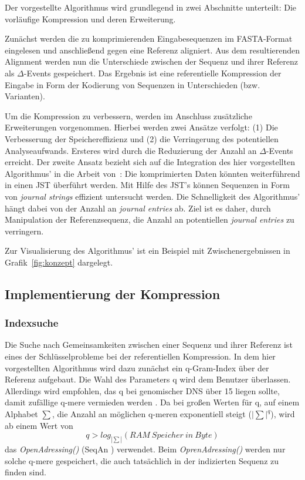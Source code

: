 \documentclass[12pt]{article}
\begin{document}
Der vorgestellte Algorithmus wird grundlegend in zwei Abschnitte unterteilt: Die vorläufige Kompression und deren Erweiterung. 

Zunächst werden die zu komprimierenden Eingabesequenzen im FASTA-Format eingelesen und anschließend gegen eine Referenz aligniert. Aus dem resultierenden Alignment werden nun die Unterschiede zwischen der Sequenz und ihrer Referenz als $\Delta$-Events gespeichert. Das Ergebnis ist eine referentielle Kompression der Eingabe in Form der Kodierung von Sequenzen in Unterschieden (bzw. Varianten).

Um die Kompression zu verbessern, werden im Anschluss zusätzliche Erweiterungen vorgenommen. Hierbei werden zwei Ansätze verfolgt: (1) Die Verbesserung der Speichereffizienz und (2) die Verringerung des potentiellen Analyseaufwands.
Ersteres wird durch die Reduzierung der Anzahl an $\Delta$-Events erreicht. Der zweite Ansatz bezieht sich auf die Integration des hier vorgestellten Algorithmus' in die Arbeit von~\cite{Rahn15072014}: Die komprimierten Daten könnten weiterführend in einen JST überführt werden. Mit Hilfe des JST's können Sequenzen in Form von \textit{journal strings} effizient untersucht werden. Die Schnelligkeit des Algorithmus' hängt dabei von der Anzahl an \textit{journal entries} ab. Ziel ist es daher, durch Manipulation der Referenzsequenz, die Anzahl an potentiellen \textit{journal entries} zu verringern.

Zur Visualisierung des Algorithmus' ist ein Beispiel mit Zwischenergebnissen in Grafik~\ref{fig:konzept} dargelegt.

\subsection{Implementierung der Kompression}
\label{sec:varcall}

\subsubsection{Indexsuche}
Die Suche nach Gemeinsamkeiten zwischen einer Sequenz und ihrer Referenz ist eines der Schlüsselprobleme bei der referentiellen Kompression. In dem hier vorgestellten Algorithmus wird dazu zunächst ein q-Gram-Index über der Referenz aufgebaut. Die Wahl des Parameters q wird dem Benutzer überlassen. Allerdings wird empfohlen, das q bei genomischer DNS über 15 liegen sollte, damit zufällige q-mere vermieden werden \cite{wandelt14trends}. Da bei großen Werten für q, auf einem Alphabet $\sum$, die Anzahl an möglichen q-meren exponentiell steigt ($|\sum|^{q}$), wird ab einem Wert von 
\begin{equation}
q>log_{|\sum|}(RAM~Speicher~in~Byte)
\end{equation}
das \textit{OpenAdressing()} (SeqAn \cite{doering08seqan}) verwendet. Beim \textit{OprenAdressing()} werden nur solche q-mere gespeichert, die auch tatsächlich in der indizierten Sequenz zu finden sind.
\end{document}
